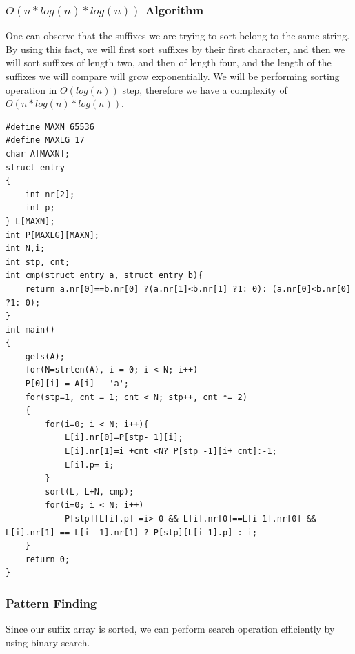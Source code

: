\documentclass[12pt]{article}
\begin{document}
        \subsubsection{$O(n * log(n) * log(n))$ Algorithm}
        
        One can observe that the suffixes we are trying to sort belong to the same string. By using this fact, we will first sort suffixes by their first character, and then we will sort suffixes of length two, and then of length four, and the length of the suffixes we will compare will grow exponentially. We will be performing sorting operation in $O(log(n))$ step, therefore we have a complexity of $O(n * log(n) * log(n))$.
        
\begin{verbatim}
#define MAXN 65536
#define MAXLG 17
char A[MAXN];
struct entry
{
    int nr[2];
    int p;
} L[MAXN];
int P[MAXLG][MAXN];
int N,i;
int stp, cnt;
int cmp(struct entry a, struct entry b){
    return a.nr[0]==b.nr[0] ?(a.nr[1]<b.nr[1] ?1: 0): (a.nr[0]<b.nr[0] ?1: 0);
}
int main()
{
    gets(A);
    for(N=strlen(A), i = 0; i < N; i++)
    P[0][i] = A[i] - 'a';
    for(stp=1, cnt = 1; cnt < N; stp++, cnt *= 2)
    {
        for(i=0; i < N; i++){
            L[i].nr[0]=P[stp- 1][i];
            L[i].nr[1]=i +cnt <N? P[stp -1][i+ cnt]:-1;
            L[i].p= i;
        }
        sort(L, L+N, cmp);
        for(i=0; i < N; i++)
            P[stp][L[i].p] =i> 0 && L[i].nr[0]==L[i-1].nr[0] && L[i].nr[1] == L[i- 1].nr[1] ? P[stp][L[i-1].p] : i;
    }
    return 0;
}

\end{verbatim}
        \newpage
        \subsubsection{Pattern Finding}
        
        Since our suffix array is sorted, we can perform search operation efficiently by using binary search.
        
\end{document}
